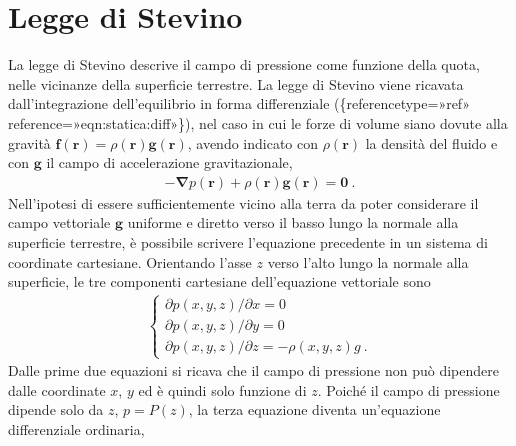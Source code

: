 \documentclass[letterpaper,10pt,italian]{jupyterBook}
\begin{document}
\section{Legge di Stevino}
\label{\detokenize{polimi/fluidmechanics-ita/template/capitoli/01_statica/02teoria:legge-di-stevino}}\label{\detokenize{polimi/fluidmechanics-ita/template/capitoli/01_statica/02teoria:fluid-mechanics-statics-stevino}}
\sphinxAtStartPar
La legge di Stevino descrive il campo di pressione come funzione della
quota, nelle vicinanze della superficie terrestre. La legge di Stevino
viene ricavata dall’integrazione dell’equilibrio in forma differenziale
(\{reference\sphinxhyphen{}type=»ref»
reference=»eqn:statica:diff»\}), nel caso in cui le forze di volume siano
dovute alla gravità \(\mathbf{f}(\mathbf{r}) = \rho(\mathbf{r}) \mathbf{g}(\mathbf{r})\),
avendo indicato con \(\rho(\mathbf{r})\) la densità del fluido e con \(\mathbf{g}\)
il campo di accelerazione gravitazionale,
\begin{equation*}
\begin{split}\label{eqn:statica:diff:g}
    - \mathbf{\nabla} p(\mathbf{r}) + \rho(\mathbf{r}) \mathbf{g}(\mathbf{r}) = \mathbf{0} \ .\end{split}
\end{equation*}
\sphinxAtStartPar
Nell’ipotesi di essere sufficientemente vicino alla terra da poter
considerare il campo vettoriale \(\mathbf{g}\) uniforme e diretto verso il
basso lungo la normale alla superficie terrestre, è possibile scrivere
l’equazione precedente in un sistema di coordinate cartesiane.
Orientando l’asse \(z\) verso l’alto lungo la normale alla superficie, le
tre componenti cartesiane dell’equazione vettoriale sono
\begin{equation*}
\begin{split}\begin{cases}
 \partial p(x,y,z) / \partial x = 0 \\
 \partial p(x,y,z) / \partial y = 0 \\ 
 \partial p(x,y,z) / \partial z = - \rho(x,y,z) g \ .
\end{cases}\end{split}
\end{equation*}
\sphinxAtStartPar
Dalle prime due equazioni si ricava che il campo di
pressione non può dipendere dalle coordinate \(x\), \(y\) ed è quindi solo
funzione di \(z\). Poiché il campo di pressione dipende solo da \(z\),
\(p = P(z)\), la terza equazione diventa un’equazione differenziale
ordinaria,
\end{document}
